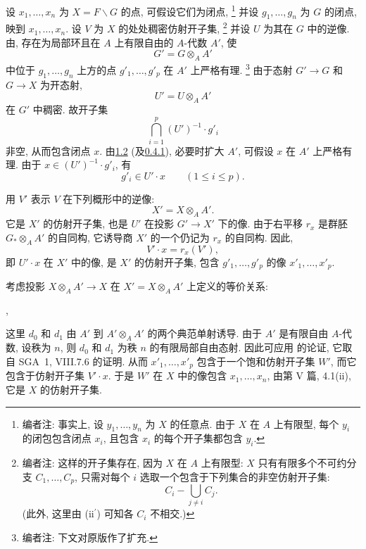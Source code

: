 设 \(x_1,\ldots,x_n\) 为 \(X=F\backslash G\) 的点, 可假设它们为闭点,%
\footnote{\label{note:sga3-VIA-38}编者注: 事实上, 设 \(y_1,\ldots,y_n\) 为 \(X\) 的任意点.
由于 \(X\) 在 \(A\) 上有限型, 每个 \(y_i\) 的闭包包含闭点 \(x_i\),
且包含 \(x_i\) 的每个开子集都包含 \(y_i\).}
并设 \(g_1,\ldots,g_n\) 为 \(G\) 的闭点, 映到 \(x_1,\ldots,x_n\).
设 \(V\) 为 \(X\) 的处处稠密仿射开子集,%
\footnote{\label{note:sga3-VIA-39}编者注: 这样的开子集存在, 因为 \(X\) 在 \(A\) 上有限型:
\(X\) 只有有限多个不可约分支 \(C_1,\ldots,C_p\),
只需对每个 \(i\) 选取一个包含于下列集合的非空仿射开子集:
\[
  C_i-\bigcup_{j\ne i}C_j.
\]
(此外, 这里由 (ii\(^{\prime}\)) 可知各 \(C_i\) 不相交.)}
并设 \(U\) 为其在 \(G\) 中的逆像.
由, 存在为局部环且在 \(A\) 上有限自由的
\(A\)-代数 \(A'\), 使
\[
  G'=G\otimes_AA'
\]
中位于 \(g_1,\ldots,g_n\) 上方的点 \(g'_1,\ldots,g'_p\)
在 \(A'\) 上严格有理.%
\footnote{\label{note:sga3-VIA-40}编者注: 下文对原版作了扩充.}
由于态射 \(G'\to G\) 和 \(G\to X\) 为开态射,
\[
  U'=U\otimes_AA'
\]
在 \(G'\) 中稠密. 故开子集
\[
  \bigcap_{i=1}^p (U')^{-1}\cdot g'_i
\]
非空, 从而包含闭点 \(x\).
由\hyperref[prop:sga3-VIA-1.2]{1.2} (及\hyperref[sga3:VIA:0.4.1]{0.4.1}),
必要时扩大 \(A'\), 可假设 \(x\) 在 \(A'\) 上严格有理.
由于 \(x\in(U')^{-1}\cdot g'_i\), 有
\[
  g'_i\in U'\cdot x
  \qquad(1\leq i\leq p).
\]

用 \(V'\) 表示 \(V\) 在下列概形中的逆像:
\[
  X'=X\otimes_AA'.
\]
它是 \(X'\) 的仿射开子集, 也是 \(U'\) 在投影 \(G'\to X'\) 下的像.
由于右平移 \(r_x\) 是群胚 \(G_*\otimes_AA'\) 的自同构,
它诱导商 \(X'\) 的一个仍记为 \(r_x\) 的自同构. 因此,
\[
  V'\cdot x=r_x(V'),
\]
即 \(U'\cdot x\) 在 \(X'\) 中的像, 是 \(X'\) 的仿射开子集,
包含 \(g'_1,\ldots,g'_p\) 的像 \(x'_1,\ldots,x'_p\).

考虑投影 \(X\otimes_AA'\to X\)
在 \(X'=X\otimes_AA'\) 上定义的等价关系:
\begin{center}
  \label{diag:sga3-VIA-3.2.1-descent-equivalence}%
  ,
\end{center}
这里 \(d_0\) 和 \(d_1\) 由 \(A'\) 到 \(A'\otimes_AA'\) 的两个典范单射诱导.
由于 \(A'\) 是有限自由 \(A\)-代数, 设秩为 \(n\),
则 \(d_0\) 和 \(d_1\) 为秩 \(n\) 的有限局部自由态射.
因此可应用 的论证,
它取自 SGA~1, VIII.7.6 的证明.
从而 \(x'_1,\ldots,x'_p\) 包含于一个饱和仿射开子集 \(W'\),
而它包含于仿射开子集 \(V'\cdot x\).
于是 \(W'\) 在 \(X\) 中的像包含 \(x_1,\ldots,x_n\),
由第 V 篇, 4.1(ii), 它是 \(X\) 的仿射开子集.
